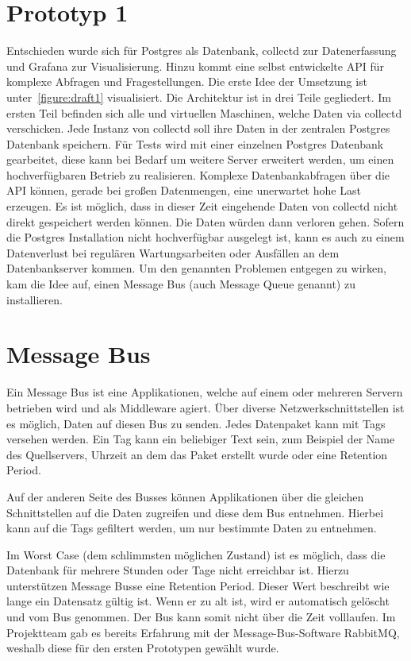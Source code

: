 \section{Prototyp 1}
Entschieden wurde sich für Postgres als Datenbank, collectd zur Datenerfassung
und Grafana zur Visualisierung. Hinzu kommt eine selbst entwickelte \gls{API}
für komplexe Abfragen und Fragestellungen. Die erste Idee der Umsetzung ist
unter~\ref{figure:draft1} visualisiert. Die Architektur ist in drei Teile
gegliedert. Im ersten Teil befinden sich alle
  und virtuellen Maschinen, welche Daten via
collectd verschicken. Jede Instanz von collectd soll ihre Daten in der
zentralen Postgres Datenbank speichern. Für Tests wird mit einer einzelnen
Postgres Datenbank gearbeitet, diese kann bei Bedarf um weitere Server
erweitert werden, um einen hochverfügbaren Betrieb zu realisieren. Komplexe
Datenbankabfragen über die \gls{API} können, gerade bei großen Datenmengen,
eine unerwartet hohe Last erzeugen. Es ist möglich, dass in dieser Zeit
eingehende Daten von collectd nicht direkt gespeichert werden können. Die Daten
würden dann verloren gehen. Sofern die Postgres Installation nicht
hochverfügbar ausgelegt ist, kann es auch zu einem Datenverlust bei regulären
Wartungsarbeiten oder Ausfällen an dem Datenbankserver kommen. Um den genannten
Problemen entgegen zu wirken, kam die Idee auf, einen Message Bus (auch Message
Queue genannt) zu installieren.
\tm%

\section{Message Bus}
Ein Message Bus ist eine Applikationen, welche auf einem oder mehreren Servern
betrieben wird und als \gls{Middleware} agiert. Über diverse
Netzwerkschnittstellen ist es möglich, Daten auf diesen Bus zu senden. Jedes
Datenpaket kann mit Tags versehen werden. Ein Tag kann ein beliebiger Text
sein, zum Beispiel der Name des Quellservers, Uhrzeit an dem das Paket erstellt
wurde oder eine Retention Period.

Auf der anderen Seite des Busses können Applikationen über die gleichen
Schnittstellen auf die Daten zugreifen und diese dem Bus entnehmen. Hierbei
kann auf die Tags gefiltert werden, um nur bestimmte Daten zu entnehmen.

Im Worst Case (dem schlimmsten möglichen Zustand) ist es möglich, dass die
Datenbank für mehrere Stunden oder Tage nicht erreichbar ist. Hierzu
unterstützen Message Busse eine Retention Period. Dieser Wert beschreibt wie
lange ein Datensatz gültig ist. Wenn er zu alt ist, wird er automatisch
gelöscht und vom Bus genommen. Der Bus kann somit nicht über die Zeit
volllaufen. Im Projektteam gab es bereits Erfahrung mit der
Message\hyp{}Bus\hyp{}Software RabbitMQ, weshalb diese für den ersten
Prototypen gewählt wurde.

